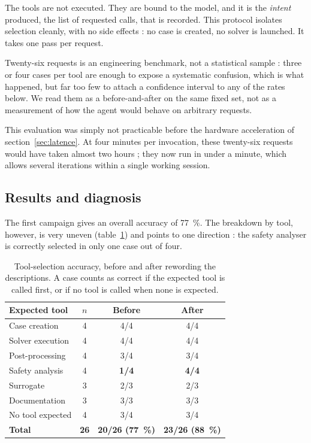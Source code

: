 \documentclass[12pt,a4paper]{report}
\begin{document}
The tools are not executed. They are bound to the model, and it is the
\emph{intent} produced, the list of requested calls, that is recorded. This
protocol isolates selection cleanly, with no side effects : no case is created,
no solver is launched. It takes one pass per request.

Twenty-six requests is an engineering benchmark, not a statistical sample :
three or four cases per tool are enough to expose a systematic confusion, which
is what happened, but far too few to attach a confidence interval to any of the
rates below. We read them as a before-and-after on the same fixed set, not as a
measurement of how the agent would behave on arbitrary requests.

This evaluation was simply not practicable before the hardware acceleration of
section~\ref{sec:latence}. At four minutes
per invocation, these twenty-six requests would have taken almost two hours ;
they now run in under a minute, which allows several iterations within a single
working session.

\subsection{Results and diagnosis}

The first campaign gives an overall accuracy of \SI{77}{\percent}. The
breakdown by tool, however, is very uneven (table~\ref{tab:toolsel}) and points
to one direction : the safety analyser is correctly selected in only one case
out of four.

\begin{table}[htbp]
\centering
\caption[Tool-selection accuracy]{Tool-selection accuracy, before and after
rewording the descriptions. A case counts as correct if the expected tool is
called first, or if no tool is called when none is expected.}
\label{tab:toolsel}
\begin{tabularx}{\textwidth}{@{}Xccc@{}}
\toprule
\textbf{Expected tool} & \textbf{$n$} & \textbf{Before} & \textbf{After}\\
\midrule
Case creation & 4 & 4/4 & 4/4\\
Solver execution & 4 & 4/4 & 4/4\\
Post-processing & 4 & 3/4 & 3/4\\
Safety analysis & 4 & \textcolor{cAlert}{\textbf{1/4}} & \textbf{4/4}\\
Surrogate & 3 & 2/3 & 2/3\\
Documentation & 3 & 3/3 & 3/3\\
No tool expected & 4 & 3/4 & 3/4\\
\midrule
\textbf{Total} & \textbf{26} & \textbf{20/26 (\SI{77}{\percent})} &
  \textbf{23/26 (\SI{88}{\percent})}\\
\bottomrule
\end{tabularx}
\end{table}
\end{document}
